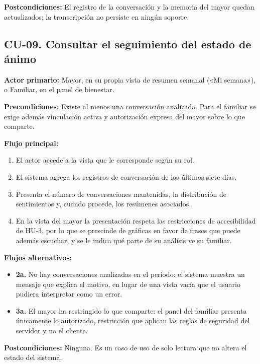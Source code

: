 \noindent\textbf{Postcondiciones:} El registro de la conversación y la memoria del mayor quedan
actualizados; la transcripción no persiste en ningún soporte.

\bigskip

\subsection*{CU-09. Consultar el seguimiento del estado de ánimo}

\noindent\textbf{Actor primario:} Mayor, en su propia vista de resumen semanal («Mi semana»), o Familiar, en
el panel de bienestar.

\noindent\textbf{Precondiciones:} Existe al menos una conversación analizada. Para el familiar se exige
además vinculación activa y autorización expresa del mayor sobre lo que comparte.

\noindent\textbf{Flujo principal:}
\begin{enumerate}[nosep]
    \item El actor accede a la vista que le corresponde según su rol.
    \item El sistema agrega los registros de conversación de los últimos siete días.
    \item Presenta el número de conversaciones mantenidas, la distribución de sentimientos y, cuando
    procede, los resúmenes asociados.
    \item En la vista del mayor la presentación respeta las restricciones de accesibilidad de HU-3, por lo
    que se prescinde de gráficas en favor de frases que puede además escuchar, y se le indica qué parte de
    su análisis ve su familiar.
\end{enumerate}

\noindent\textbf{Flujos alternativos:}
\begin{itemize}[nosep]
    \item \textbf{2a.} No hay conversaciones analizadas en el periodo: el sistema muestra un mensaje que
    explica el motivo, en lugar de una vista vacía que el usuario pudiera interpretar como un error.
    \item \textbf{3a.} El mayor ha restringido lo que comparte: el panel del familiar presenta únicamente
    lo autorizado, restricción que aplican las reglas de seguridad del servidor y no el cliente.
\end{itemize}

\noindent\textbf{Postcondiciones:} Ninguna. Es un caso de uso de solo lectura que no altera el estado del
sistema.

